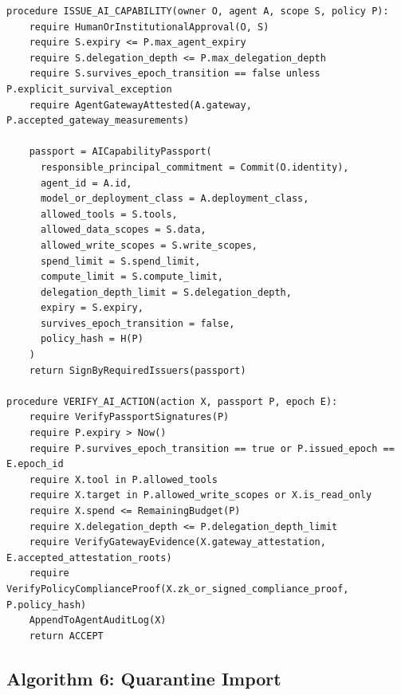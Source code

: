 \documentclass[11pt,letterpaper]{article}
\begin{document}
\begin{lstlisting}[caption={AI capability passport and action verification}]
procedure ISSUE_AI_CAPABILITY(owner O, agent A, scope S, policy P):
    require HumanOrInstitutionalApproval(O, S)
    require S.expiry <= P.max_agent_expiry
    require S.delegation_depth <= P.max_delegation_depth
    require S.survives_epoch_transition == false unless P.explicit_survival_exception
    require AgentGatewayAttested(A.gateway, P.accepted_gateway_measurements)

    passport = AICapabilityPassport(
      responsible_principal_commitment = Commit(O.identity),
      agent_id = A.id,
      model_or_deployment_class = A.deployment_class,
      allowed_tools = S.tools,
      allowed_data_scopes = S.data,
      allowed_write_scopes = S.write_scopes,
      spend_limit = S.spend_limit,
      compute_limit = S.compute_limit,
      delegation_depth_limit = S.delegation_depth,
      expiry = S.expiry,
      survives_epoch_transition = false,
      policy_hash = H(P)
    )
    return SignByRequiredIssuers(passport)

procedure VERIFY_AI_ACTION(action X, passport P, epoch E):
    require VerifyPassportSignatures(P)
    require P.expiry > Now()
    require P.survives_epoch_transition == true or P.issued_epoch == E.epoch_id
    require X.tool in P.allowed_tools
    require X.target in P.allowed_write_scopes or X.is_read_only
    require X.spend <= RemainingBudget(P)
    require X.delegation_depth <= P.delegation_depth_limit
    require VerifyGatewayEvidence(X.gateway_attestation, E.accepted_attestation_roots)
    require VerifyPolicyComplianceProof(X.zk_or_signed_compliance_proof, P.policy_hash)
    AppendToAgentAuditLog(X)
    return ACCEPT
\end{lstlisting}

\subsection{Algorithm 6: Quarantine Import}
\end{document}
